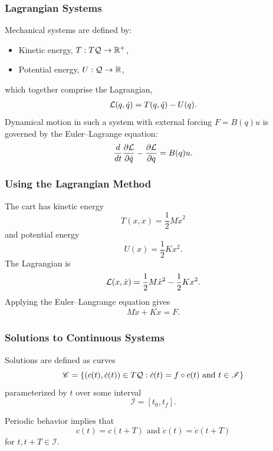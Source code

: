 \begin{frame}
  \frametitle{Lagrangian Systems}
  Mechanical systems are defined by:
  \begin{itemize}
  \item Kinetic energy, $T : T\mathcal{Q} \to \mathbb{R}^+$,
  \item Potential energy, $U : \mathcal{Q} \to \mathbb{R}$,
  \end{itemize}
  which together comprise the Lagrangian,
  \begin{align*}
    \mathcal{L}(q, \dot q) = T(q, \dot q) - U(q).
  \end{align*}
  Dynamical motion in such a system with external forcing $F = B(q) u$ is governed by the Euler--Lagrange equation:
  \begin{align*}
    \frac{d}{dt} \frac{\partial{\ensuremath{\mathcal{L}}}}{\partial{\ensuremath{\dot q}}} - \frac{\partial{\ensuremath{\mathcal{L}}}}{\partial{\ensuremath{q}}} = B(q) u.
  \end{align*}
\end{frame}

\begin{frame}
  \frametitle{Using the Lagrangian Method}
  The cart has kinetic energy $$T(x, {\dot x}) = \frac{1}{2} M {\dot x}^2$$ and potential energy $$U(x) = \frac{1}{2} K x^{2}.$$
  The Lagrangian is
  \begin{align*}
    \mathcal{L}(x, {\dot x}) = \frac{1}{2} M {\dot x}^2 - \frac{1}{2} K x^{2}.
  \end{align*}
  Applying the Euler--Langrange equation gives
  \begin{align*}
    M {\ddot x} + K x = F.
  \end{align*}
\end{frame}

\begin{frame}
  \frametitle{Solutions to Continuous Systems}
  Solutions are defined as curves $$\mathscr{C} = \left\{ (c(t), {\dot c(t)}) \in T\mathcal{Q} : \dot c(t) = f \circ c(t) \mbox{ and } t \in \mathscr{I} \right\}$$ parameterized by $t$ over some interval $$\mathscr{I} = [t_0, t_f].$$

  Periodic behavior implies that $$c(t) = c(t + T) \mbox{ and } {\dot c}(t) = {\dot c}(t + T)$$ for $t, t + T \in \mathscr{I}$.
\end{frame}

